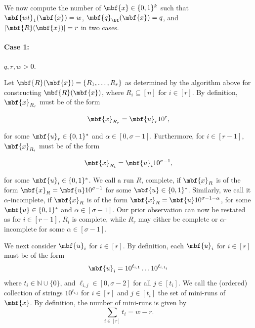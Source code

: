 We now compute the number of $\mbf{x} \in \{0,1\}^{k}$ such that $\mbf{wt}_1(\mbf{x}) = w$, $\mbf{q}_{\bt}(\mbf{x}) = q$, and $|\mbf{R}(\mbf{x})| = r$ in two cases. %

\paragraph{Case 1:} $q, r, w > 0$.

Let $\mbf{R}(\mbf{x}) = \{R_1, \ldots, R_r\}$ as determined by the algorithm above for constructing $\mbf{R}(\mbf{x})$, where $R_i \subseteq [n]$ for $i \in [r]$. By definition, $\mbf{x}_{R_r}$ must be of the form

\begin{equation*}
    \mbf{x}_{R_r} = \mbf{u}_r10^{c},
\end{equation*}

for some $\mbf{u}_r \in \{0,1\}^{*}$ and $\alpha \in [0, \sigma-1]$. Furthermore, for $i \in [r-1]$, $\mbf{x}_{R_i}$ must be of the form

\begin{equation*}
    \mbf{x}_{R_i} = \mbf{u}_i10^{\sigma-1},
\end{equation*}

for some $\mbf{u}_i \in \{0,1\}^{*}$. We call a run $R$, complete, if $\mbf{x}_{R}$ is of the form $\mbf{x}_{R} = \mbf{u}10^{\sigma-1}$ for some $\mbf{u} \in \{0,1\}^{*}$. Similarly, we call it $\alpha$-incomplete, if $\mbf{x}_{R}$ is of the form $\mbf{x}_{R} = \mbf{u}10^{\sigma - 1 - \alpha}$, for some $\mbf{u} \in \{0,1\}^{*}$ and $\alpha\in[\sigma-1]$. Our prior observation can now be restated as for $i \in [r-1]$, $R_i$ is complete, while $R_r$ may either be complete or $\alpha$-incomplete for some $\alpha\in[\sigma-1]$.

We next consider $\mbf{u}_i$ for $i\in[r]$. By definition, each $\mbf{u}_i$ for $i \in [r]$ must be of the form$$\mbf{u}_i = 10^{\ell_{i,1}}\ldots10^{\ell_{i,t_i}}$$where $t_i \in \mathbb{N}\cup\{0\}$, and $\ell_{i,j} \in [0, \sigma-2]$ for all $j \in [t_i]$. We call the (ordered) collection of strings $10^{\ell_{i,j}}$ for $i\in[r]$ and $j\in[t_i]$ the set of mini-runs of $\mbf{x}$. By definition, the number of mini-runs is given by
\begin{equation*}
    \sum_{i\in[r]}t_i = w-r.
\end{equation*}


